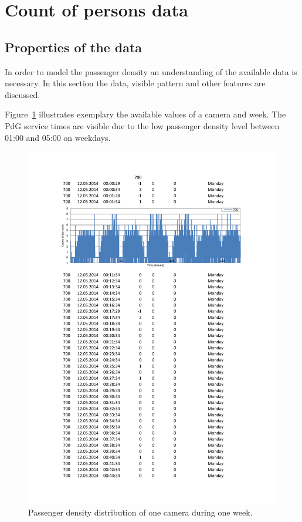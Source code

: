 \section{Count of persons data}

\subsection{Properties of the data}
\label{sec:PassengerDensityData}

In order to model the passenger density an understanding of the available data is necessary. In this section the data, visible pattern and other features are discussed.

Figure~\ref{fig:rawData_week} illustrates exemplary the available values of a camera and week. The PdG service times are visible due to the low passenger density level between 01:00 and 05:00 on weekdays.

\begin{figure}%
  \centering
  \includegraphics[width=\textwidth]{Figures/rawData_week.pdf}
  \caption{Passenger density distribution of one camera during one week.}
  \label{fig:rawData_week}
\end{figure}



